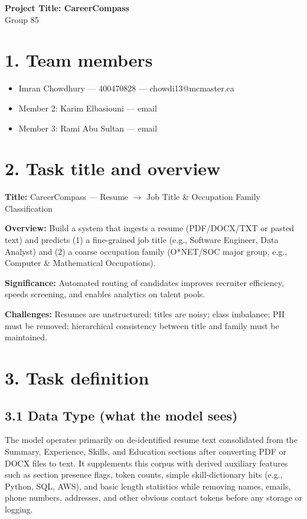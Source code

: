 \documentclass[12pt]{article}
\begin{document}
\begin{center}
  {\Large\bfseries Project Title: CareerCompass}\\[8pt]
  {\normalsize Group 85}
\end{center}

\section*{1. Team members}
\begin{itemize}
  \item Imran Chowdhury — 400470828 — chowdi13@mcmaster.ca
  \item Member 2: Karim Elbasiouni — email
  \item Member 3: Rami Abu Sultan — email
\end{itemize}

\section*{2. Task title and overview}
\textbf{Title:} CareerCompass — Resume $\rightarrow$ Job Title \& Occupation Family Classification

\textbf{Overview:} Build a system that ingests a resume (PDF/DOCX/TXT or pasted text) and predicts (1) a fine-grained job title (e.g., Software Engineer, Data Analyst) and (2) a coarse occupation family (O*NET/SOC major group, e.g., Computer \& Mathematical Occupations).  

\textbf{Significance:} Automated routing of candidates improves recruiter efficiency, speeds screening, and enables analytics on talent pools.  

\textbf{Challenges:} Resumes are unstructured; titles are noisy; class imbalance; PII must be removed; hierarchical consistency between title and family must be maintained.

\setlength{\parindent}{0pt}

\section*{3. Task definition}
\subsection*{3.1 Data Type (what the model sees)}
The model operates primarily on de-identified resume text consolidated from the Summary, Experience, Skills, and Education sections after converting PDF or DOCX files to text. It supplements this corpus with derived auxiliary features such as section presence flags, token counts, simple skill-dictionary hits (e.g., Python, SQL, AWS), and basic length statistics while removing names, emails, phone numbers, addresses, and other obvious contact tokens before any storage or logging.
\end{document}
